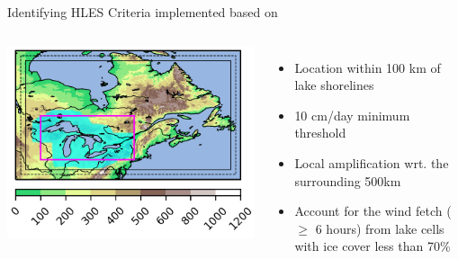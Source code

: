 \documentclass{beamer}
\begin{document}
  \begin{frame}{Identifying HLES}
    Criteria implemented based on \citet{Notaro:2015}
    \begin{columns}
        \includegraphics[width=\textwidth, trim=3cm 8cm 12.5cm 7cm, clip]{sim_domain_and_focus_region}
        \begin{itemize}
          \item Location within 100 km of lake shorelines
          \item 10 cm/day minimum threshold
          \item Local amplification wrt. the surrounding 500km
          \item Account for the wind fetch ($\geq$ 6 hours) from lake cells with ice cover less than 70\%
        \end{itemize}
    \end{columns}
  \end{frame}
\end{document}

